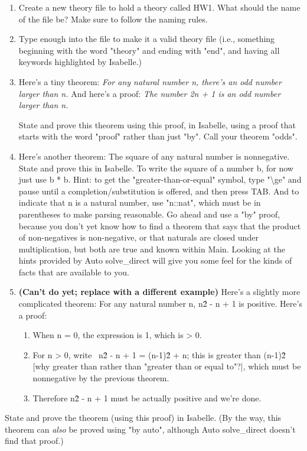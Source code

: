 \begin{enumerate}
    \item Create a new theory file to hold a theory called HW1. What should the name of the file be? Make sure to follow the naming rules.
    \item Type enough into the file to make it a valid theory file (i.e., something beginning with the word "theory" and ending with "end", and having all keywords highlighted by Isabelle.)
    \item Here's a tiny theorem: \textit{For any natural number n, there's an odd number larger than n. }And here's a proof:\textit{ The number 2n + 1 is an odd number larger than n. }

State and prove this theorem using this proof, in Isabelle, using a proof that starts with the word "proof" rather than just "by". Call your theorem "odds".
    \item Here's another theorem: The square of any natural number is nonnegative. State and prove this in Isabelle. To write the square of a number b, for now just use b * b. Hint: to get the "greater-than-or-equal" symbol, type "\textbackslash{}ge" and pause until a completion/substitution is offered, and then press TAB. And to indicate that n is a natural number, use "n::nat", which must be in parentheses to make parsing reasonable. Go ahead and use a "by" proof, because you don't yet know how to find a theorem that says that the product of non-negatives is non-negative, or that naturals are closed under multiplication, but both are true and known within Main. Looking at the hints provided by Auto solve\_direct will give you some feel for the kinds of facts that are available to you. 
    \item \textbf{(Can't do yet; replace with a different example)} Here's a slightly more complicated theorem: For any natural number n, n\^2 - n + 1 is positive. Here's a proof:

\begin{enumerate}
        \item When n = 0, the expression is 1, which is > 0. 
        \item For n > 0, write  n\^2 - n + 1 = (n-1)\^2 + n; this is greater than (n-1)\^2  [why greater than rather than "greater than or equal to"?|, which must be nonnegative by the previous theorem. 
        \item Therefore n\^2 - n + 1 must be actually positive and we're done. 
\end{enumerate}

\end{enumerate}
State and prove the theorem (using this proof) in Isabelle. (By the way, this theorem can \textit{also }be proved using "by auto", although Auto solve\_direct doesn't find that proof.)

